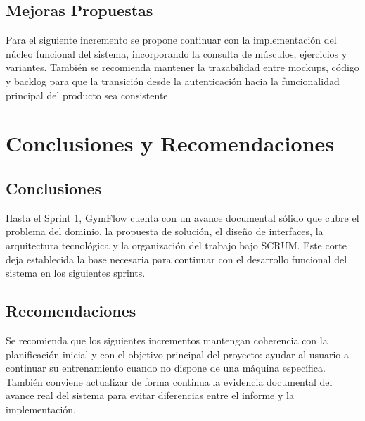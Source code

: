 \documentclass[12pt,letterpaper]{article}
\begin{document}
\subsection{Mejoras Propuestas}

Para el siguiente incremento se propone continuar con la implementación del núcleo funcional del sistema, incorporando la consulta de músculos, ejercicios y variantes. También se recomienda mantener la trazabilidad entre mockups, código y backlog para que la transición desde la autenticación hacia la funcionalidad principal del producto sea consistente.

\section{Conclusiones y Recomendaciones}

\subsection{Conclusiones}

Hasta el Sprint 1, GymFlow cuenta con un avance documental sólido que cubre el problema del dominio, la propuesta de solución, el diseño de interfaces, la arquitectura tecnológica y la organización del trabajo bajo SCRUM. Este corte deja establecida la base necesaria para continuar con el desarrollo funcional del sistema en los siguientes sprints.

\subsection{Recomendaciones}

Se recomienda que los siguientes incrementos mantengan coherencia con la planificación inicial y con el objetivo principal del proyecto: ayudar al usuario a continuar su entrenamiento cuando no dispone de una máquina específica. También conviene actualizar de forma continua la evidencia documental del avance real del sistema para evitar diferencias entre el informe y la implementación.
\end{document}
